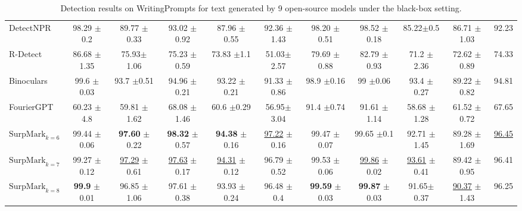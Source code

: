 \documentclass{article}
\newcommand{\com}[1]{\tiny$\pm$#1}
\theoremstyle{plain}
\theoremstyle{definition}
\theoremstyle{remark}
\begin{document}
\begin{table}[htbp]
{{\begin{tabular}{lcccccccccc}
DetectNPR & 98.29 \com 0.2 & 89.77 \com 0.33 & 93.02 \com 0.92 & 87.96 \com 0.55 & 92.36 \com 1.43 & 98.20 \com 0.51 & 98.52 \com 0.18 & 85.22\com 0.5 & 86.71 \com 1.03 & 92.23 \\

R-Detect &  86.68 \com 1.35 &  75.93\com 1.06 & 75.23 \com 0.59 & 73.83 \com 1.1 &   51.03\com 2.57 & 79.69 \com 0.88 & 82.79  \com 0.93& 71.2 \com 2.36 & 72.62 \com 0.89 & 74.33 \\

Binoculars & 99.6 \com 0.03 & 93.7 \com 0.51 &  94.96 \com 0.21 & 93.22 \com 0.21 & 91.33 \com 0.86 &  98.9 \com 0.16 & 99  \com 0.06& 93.4 \com 0.27 & 89.22 \com 0.82 & 94.81 \\

FourierGPT & 60.23 \com 4.8 & 59.81 \com 1.62 &68.08  \com 1.46 & 60.6 \com 0.29 & 56.95\com 3.04 & 91.4 \com 0.74 &  91.61 \com 1.14 & 58.68 \com 1.28 & 61.52 \com 0.72 & 67.65 \\

\rowcolor{ours}$\text{SurpMark}_{k=6}$ & 99.44 \com 0.06 & \textbf{97.60}  \com 0.22 & \textbf{98.32} \com 0.57 & \textbf{94.38} \com 0.16 & \underline{97.22} \com 0.16 & 99.47 \com 0.07 & 99.65 \com 0.1 & 92.71 \com 1.45 & 89.28  \com 1.69 & \underline{96.45} \\

\rowcolor{ours}$\text{SurpMark}_{k=7}$ & 99.27 \com 0.12 & \underline{97.29} \com 0.61 & \underline{97.63} \com 0.17 & \underline{94.31} \com 0.12 & 96.79 \com 0.52 & 99.53 \com 0.06 & \underline{99.86} \com 0.02 & \underline{93.61} \com 0.41 & 89.42 \com 0.95 & 96.41 \\

\rowcolor{ours}$\text{SurpMark}_{k=8}$ & \textbf{99.9} \com 0.01 & 96.85 \com 1.06 & 97.61 \com 0.38 & 93.93 \com 0.24 & 96.48 \com 0.4 & \textbf{99.59} \com 0.03 & \textbf{99.87} \com 0.03 & 91.65\com 0.37 & \underline{90.37} \com 1.43 & 96.25 \\
\bottomrule
\end{tabular}}}
\caption{Detection results on WritingPrompts for text generated by 9 open-source models under the black-box setting.}
\label{tab:opensource-writing}
\end{table}
\end{document}
